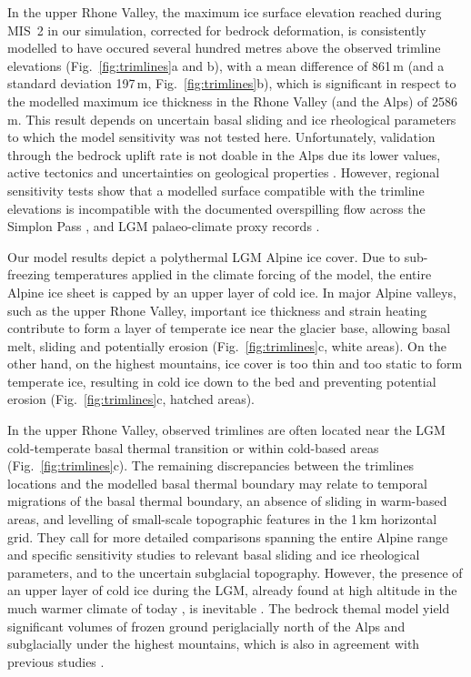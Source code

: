 \documentclass[tc, manuscript]{copernicus}
\begin{document}
    In the upper Rhone Valley, the maximum ice surface elevation reached
    during MIS~2 in our simulation, corrected for bedrock deformation, is
    consistently modelled to have occured several hundred metres above the
    observed trimline elevations (Fig.~\ref{fig:trimlines}a and b), with a mean
    difference of 861\,m (and a standard deviation 197\,m,
    Fig.~\ref{fig:trimlines}b), which is significant in respect to the modelled
    maximum ice thickness in the Rhone Valley (and the Alps) of 2586\,m. This
    result depends on uncertain basal sliding and ice rheological parameters
    to which the model sensitivity was not tested here. Unfortunately,
    validation through the bedrock uplift rate \citep[cf.][]{Kuchar.etal.2012}
    is not doable in the Alps due its lower values, active tectonics and
    uncertainties on geological properties \citep[cf.][]{Mey.etal.2016}.
    However, regional sensitivity tests show that a modelled surface compatible
    with the trimline elevations is incompatible with the documented
    overspilling flow across the Simplon Pass \citep{Becker.etal.2017}, and LGM
    palaeo-climate proxy records \citep{Cohen.etal.2017}.

    Our model results depict a polythermal LGM Alpine ice cover.
    Due to sub-freezing temperatures applied in the climate forcing of the
    model, the entire Alpine ice sheet is capped by an upper layer of cold ice.
    In major Alpine valleys, such as the upper Rhone Valley, important ice
    thickness and strain heating contribute to form a layer of temperate ice
    near the glacier base, allowing basal melt, sliding and potentially
    erosion (Fig.~\ref{fig:trimlines}c, white areas). On the other hand, on the
    highest mountains, ice cover is too thin and too static to form temperate
    ice, resulting in cold ice down to the bed and preventing potential erosion
    (Fig.~\ref{fig:trimlines}c, hatched areas).

    In the upper Rhone Valley, observed trimlines are often located near the
    LGM cold-temperate basal thermal transition or within cold-based areas
    (Fig.~\ref{fig:trimlines}c). The remaining discrepancies between the
    trimlines locations and the modelled basal thermal boundary may relate to
    temporal migrations of the basal thermal boundary, an absence of sliding in
    warm-based areas, and levelling of small-scale topographic features in the
    1\,km horizontal grid. They call for more detailed comparisons
    spanning the entire Alpine range and specific sensitivity studies to
    relevant basal sliding and ice rheological parameters, and to the uncertain
    subglacial topography. However, the presence of an upper layer of
    cold ice during the LGM, already found at high altitude in the much warmer
    climate of today \citep[e.g.,][]{Suter.etal.2001, Bohleber.etal.2017}, is
    inevitable \citep{Blatter.Haeberli.1984, Haeberli.Schluchter.1987,
    Cohen.etal.2017}. The bedrock themal model yield significant volumes of
    frozen ground periglacially north of the Alps and subglacially under the
    highest mountains, which is also in agreement with previous studies
    \citep{Haeberli.etal.1984, Lindgren.etal.2016, Cohen.etal.2017}.
\end{document}
